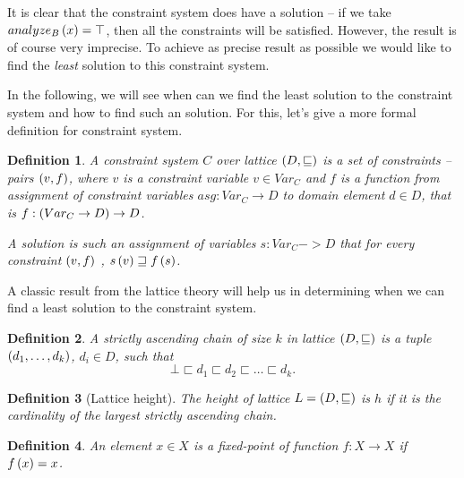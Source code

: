 \documentclass[..thesis.tex]{subfiles}
\newtheorem{defin}{Definition}[section]
\begin{document}

It is clear that the constraint system does have a solution -- if we take $analyze_B \left( x \right) = \top$, then all the constraints will be satisfied. However, the result is of course very imprecise. To achieve as precise result as possible we  would like to find the \textit{least} solution to this constraint system. 

In the following, we will see when can we find the least solution to the constraint system and how to find such an solution. For this, let's give a more formal definition for constraint system.

\begin{defin}
A \textit{constraint system} $C$ over lattice $\left( D, \sqsubseteq \right)$ is a set of \textit{constraints} -- pairs $\left( v, f \right)$, where $v$ is a constraint variable $v \in Var_C$ and $f$ is a function from assignment of constraint variables $asg: Var_C \to D$ to domain element $d \in D$, that is $f : \left( Var_C \to D \right) \to D$.

A \textit{solution} is such an assignment of variables $s : Var_C -> D$ that for every constraint $\left( v, f \right)$ , $ s \left( v \right) \sqsupseteq f \left( s \right)$. 
\end{defin}

A classic result from the lattice theory will help us in determining when we can find a least solution to the constraint system.

\begin{defin}
  A \textit{strictly ascending chain} of size $k$ in lattice $\left( D, \sqsubseteq \right)$ is a tuple $\left( d_1, \ldots, d_k \right)$, $d_i \in D$, such that
  \begin{equation*}
    \bot \sqsubset d_1 \sqsubset d_2 \sqsubset \ldots \sqsubset d_k \text{.}
  \end{equation*}
\end{defin}

\begin{defin}[Lattice height]
  The \textit{height} of lattice $L=\left( D, \sqsubseteq \right)$ is $h$  if it is the cardinality of the largest strictly ascending chain.
\end{defin}

\begin{defin}
  An element $x \in X$ is a  \textit{fixed-point} of function  $f : X \to X$ if $ f \left( x \right) = x$.
\end{defin}
\end{document}
